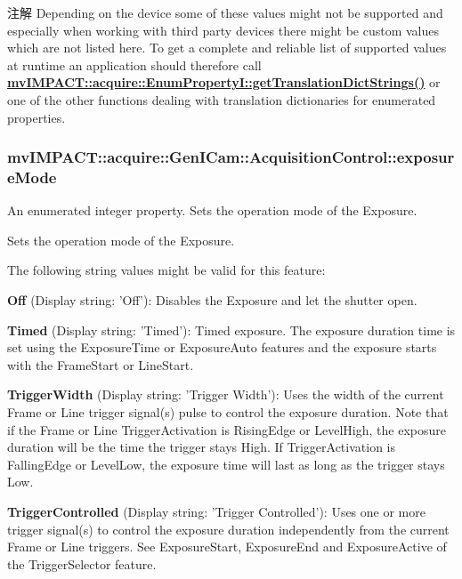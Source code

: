\begin{DoxyNote}{注解}
Depending on the device some of these values might not be supported and especially when working with third party devices there might be custom values which are not listed here. To get a complete and reliable list of supported values at runtime an application should therefore call {\bfseries \hyperlink{classmv_i_m_p_a_c_t_1_1acquire_1_1_enum_property_i_a0ba6ccbf5ee69784d5d0b537924d26b6}{mv\+I\+M\+P\+A\+C\+T\+::acquire\+::\+Enum\+Property\+I\+::get\+Translation\+Dict\+Strings()}} or one of the other functions dealing with translation dictionaries for enumerated properties. 
\end{DoxyNote}
\hypertarget{classmv_i_m_p_a_c_t_1_1acquire_1_1_gen_i_cam_1_1_acquisition_control_a0dfebf2075d401828a7eac11fac790d0}{
\subsubsection[{exposure\+Mode}]{ mv\+I\+M\+P\+A\+C\+T\+::acquire\+::\+Gen\+I\+Cam\+::\+Acquisition\+Control\+::exposure\+Mode}}\label{classmv_i_m_p_a_c_t_1_1acquire_1_1_gen_i_cam_1_1_acquisition_control_a0dfebf2075d401828a7eac11fac790d0}


An enumerated integer property. Sets the operation mode of the Exposure. 

Sets the operation mode of the Exposure.

The following string values might be valid for this feature\+:
\begin{DoxyItemize}
\item {\bfseries Off} (Display string\+: 'Off')\+: Disables the Exposure and let the shutter open.
\item {\bfseries Timed} (Display string\+: 'Timed')\+: Timed exposure. The exposure duration time is set using the Exposure\+Time or Exposure\+Auto features and the exposure starts with the Frame\+Start or Line\+Start.
\item {\bfseries Trigger\+Width} (Display string\+: 'Trigger Width')\+: Uses the width of the current Frame or Line trigger signal(s) pulse to control the exposure duration. Note that if the Frame or Line Trigger\+Activation is Rising\+Edge or Level\+High, the exposure duration will be the time the trigger stays High. If Trigger\+Activation is Falling\+Edge or Level\+Low, the exposure time will last as long as the trigger stays Low.
\item {\bfseries Trigger\+Controlled} (Display string\+: 'Trigger Controlled')\+: Uses one or more trigger signal(s) to control the exposure duration independently from the current Frame or Line triggers. See Exposure\+Start, Exposure\+End and Exposure\+Active of the Trigger\+Selector feature.
\end{DoxyItemize}

